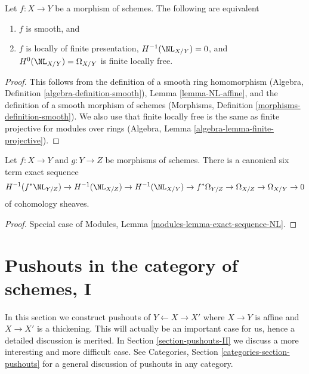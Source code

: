 \begin{lemma}
\label{lemma-NL-smooth}
Let $f : X \to Y$ be a morphism of schemes. The following are equivalent
\begin{enumerate}
\item $f$ is smooth, and
\item $f$ is locally of finite presentation,
$H^{-1}(\NL_{X/Y}) = 0$, and $H^0(\NL_{X/Y}) = \Omega_{X/Y}$
is finite locally free.
\end{enumerate}
\end{lemma}

\begin{proof}
This follows from the definition of a smooth ring homomorphism
(Algebra, Definition \ref{algebra-definition-smooth}),
Lemma \ref{lemma-NL-affine}, and
the definition of a smooth morphism of schemes
(Morphisms, Definition \ref{morphisms-definition-smooth}).
We also use that finite locally free is the same as
finite projective for modules over rings
(Algebra, Lemma \ref{algebra-lemma-finite-projective}).
\end{proof}

\begin{lemma}
\label{lemma-exact-sequence-NL}
Let $f : X \to Y$ and $g : Y \to Z$ be morphisms of schemes.
There is a canonical six term exact sequence
$$
H^{-1}(f^*\NL_{Y/Z}) \to
H^{-1}(\NL_{X/Z}) \to
H^{-1}(\NL_{X/Y}) \to
f^*\Omega_{Y/Z} \to \Omega_{X/Z} \to \Omega_{X/Y} \to 0
$$
of cohomology sheaves.
\end{lemma}

\begin{proof}
Special case of Modules, Lemma \ref{modules-lemma-exact-sequence-NL}.
\end{proof}










\section{Pushouts in the category of schemes, I}
\label{section-pushouts}

\noindent
In this section we construct pushouts of $Y \leftarrow X \rightarrow X'$
where $X \to Y$ is affine and $X \to X'$ is a thickening. This will
actually be an important case for us, hence a detailed discussion is merited.
In Section \ref{section-pushouts-II} we discuss a more interesting
and more difficult case. See Categories, Section
\ref{categories-section-pushouts} for a general
discussion of pushouts in any category.

